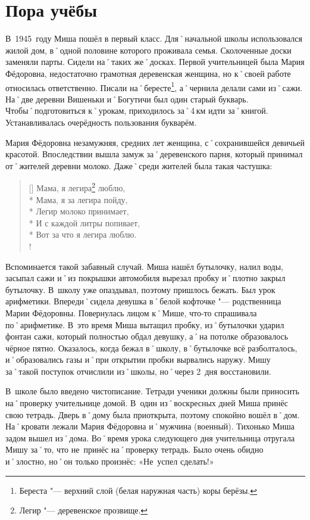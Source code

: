 ﻿\chapter{Пора учёбы}
В~1945~году Миша пошёл в первый класс. Для˚начальной школы использовался жилой дом, в˚одной половине которого проживала семья. Сколоченные доски заменяли парты. Сидели на˚таких же˚досках. Первой учительницей была Мария Фёдоровна, недостаточно грамотная деревенская женщина, но к˚своей работе относилась ответственно. Писали на˚бересте\footnote{Береста "--- верхний слой (белая наружная часть) коры берёзы.}, а˚чернила делали сами из˚сажи. На˚две деревни Вишеньки и˚Богутичи был один старый букварь. Чтобы˚подготовиться к˚урокам, приходилось за˚4\,км идти за˚книгой. Устанавливалась очерёдность пользования букварём.

Мария Фёдоровна незамужняя, средних лет женщина, с˚сохранившейся девичьей красотой. Впоследствии вышла замуж за˚деревенского парня, который принимал от˚жителей деревни молоко. Даже˚среди жителей была такая частушка:

\settowidth{\versewidth}{Легир молоко принимает,}		%
\begin{verse}[\versewidth]
	Мама, я легира\footnote{Легир "--- деревенское прозвище.}  люблю, \\* 
	Мама, я за легира пойду, \\*	
	Легир молоко принимает, \\*
	И с каждой литры попивает, \\*
	Вот за что я легира люблю. \\!
\end{verse}

Вспоминается такой забавный случай. Миша нашёл бутылочку, налил воды, засыпал сажи и˚из покрышки автомобиля вырезал пробку и˚плотно закрыл бутылочку. В~школу уже опаздывал, поэтому пришлось бежать. Был урок арифметики. Впереди˚сидела девушка в˚белой кофточке "--- родственница Марии Фёдоровны. Повернулась лицом к˚Мише, что-то спрашивала по˚арифметике. В~это время Миша вытащил пробку, из˚бутылочки ударил фонтан сажи, который полностью обдал девушку, а˚на потолке образовалось чёрное пятно. Оказалось, когда бежал в˚школу, в˚бутылочке всё разболталось, и˚образовались газы и˚при открытии пробки вырвались наружу. Мишу за˚такой поступок отчислили из˚школы, но˚через 2~дня восстановили.

В~школе было введено чистописание. Тетради ученики должны были приносить на˚проверку учительнице домой. В~один из˚воскресных дней Миша принёс свою тетрадь. Дверь в˚дому была приоткрыта, поэтому спокойно вошёл в˚дом. На˚кровати лежали Мария Фёдоровна и˚мужчина (военный). Тихонько Миша задом вышел из˚дома. Во˚время урока следующего дня учительница отругала Мишу за˚то, что не~принёс на˚проверку тетрадь. Было очень обидно и˚злостно, но˚он только произнёс: «Не~успел сделать!»

